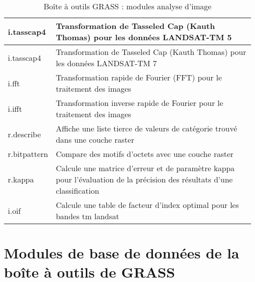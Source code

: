 \begin{table}[H]
\begin{tabular}{|p{4cm}|p{10cm}|}
  \hline i.tasscap4 & Transformation de Tasseled Cap (Kauth Thomas) pour les données LANDSAT-TM 5 \\
  \hline i.tasscap4 & Transformation de Tasseled Cap (Kauth Thomas) pour les données LANDSAT-TM 7 \\
  \hline i.fft & Transformation rapide de Fourier (FFT) pour le traitement des images \\
  \hline i.ifft & Transformation inverse rapide de Fourier pour le traitement des images \\
  \hline r.describe & Affiche une liste tierce de valeurs de catégorie trouvé dans une couche raster\\
  \hline r.bitpattern & Compare des motifs d'octets avec une couche raster\\
  \hline r.kappa & Calcule une matrice d'erreur et de paramètre kappa pour l'évaluation de la précision des résultats d'une classification \\
  \hline i.oif & Calcule une table de facteur d'index optimal pour les bandes tm landsat \\
\hline
\end{tabular}
\caption{Boîte à outils GRASS : modules analyse d'image}
\end{table}

\section{Modules de base de données de la boîte à outils de GRASS}


